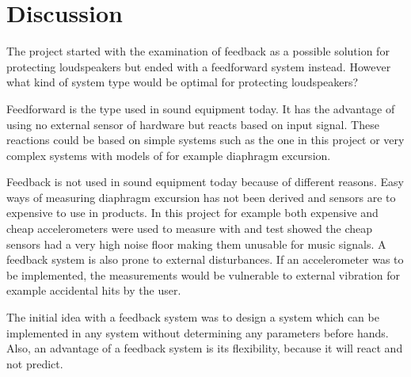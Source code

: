 \chapter{Discussion}
The project started with the examination of feedback as a possible solution for protecting loudspeakers but ended with a feedforward system instead. However what kind of system type would be optimal for protecting loudspeakers?

Feedforward is the type used in sound equipment today. It has the advantage of using no external sensor of hardware but reacts based on input signal. These reactions could be based on simple systems such as the one in this project or very complex systems with models of for example diaphragm excursion. 

Feedback is not used in sound equipment today because of different reasons. Easy ways of measuring diaphragm excursion has not been derived and sensors are to expensive to use in products. In this project for example both expensive and cheap accelerometers were used to measure with and test showed the cheap sensors had a very high noise floor making them unusable for music signals. A feedback system is also prone to external disturbances. If an accelerometer was to be implemented, the measurements would be vulnerable to external vibration for example accidental hits by the user. 

The initial idea with a feedback system was to design a system which can be implemented in any system without determining any parameters before hands. Also, an advantage of a feedback system is its flexibility, because it will react and not predict.



